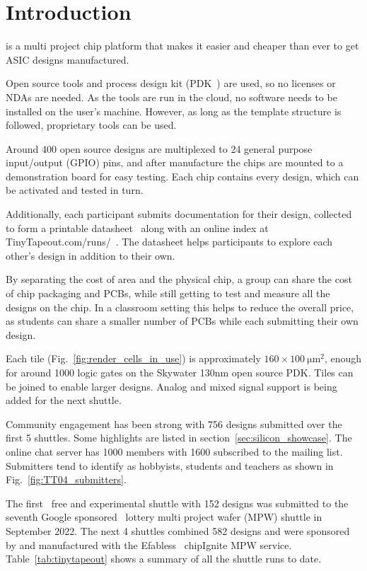 \section{Introduction}
\label{sec:introduction}
 is a multi project chip platform that makes it easier and cheaper than ever to get ASIC designs manufactured.

Open source tools and process design kit (PDK~\cite{pdk}) are used, so no licenses or NDAs are needed. As the tools are run in the cloud, no software needs to be installed on the user's machine. However, as long as the template structure is followed, proprietary tools can be used.

Around 400 open source designs are multiplexed to 24 general purpose input/output (GPIO) pins, and after manufacture the chips are mounted to a demonstration board for easy testing. Each chip contains every design, which can be activated and tested in turn.

Additionally, each participant submits documentation for their design, collected to form a printable datasheet~\cite{datasheet} along with an online index at TinyTapeout.com/runs/~\cite{tinytapeoutruns}. The datasheet helps participants to explore each other's design in addition to their own.

By separating the cost of area and the physical chip, a group can share the cost of chip packaging and PCBs, while still getting to test and measure all the designs on the chip. In a classroom setting this helps to reduce the overall price, as students can share a smaller number of PCBs while each submitting their own design.

Each tile (Fig.~\ref{fig:render_cells_in_use}) is approximately $160 \times \qty{100}{\micro\meter\squared}$, enough for around 1000 logic gates on the Skywater 130nm open source PDK. Tiles can be joined to enable larger designs. Analog and mixed signal support is being added for the next shuttle.

Community engagement has been strong with 756 designs submitted over the first 5 shuttles. Some highlights are listed in section~\ref{sec:silicon_showcase}.
The online chat server has 1000 members with 1600 subscribed to the mailing list. Submitters tend to identify as hobbyists, students and teachers as shown in Fig.~\ref{fig:TT04_submitters}.

The first~\cite{firstshuttle} free and experimental shuttle with 152 designs was submitted to the seventh Google sponsored~\cite{googlesponsored} lottery multi project wafer (MPW) shuttle in September 2022.
The next 4 shuttles combined 582 designs and were sponsored by and manufactured with the Efabless~\cite{efabless} chipIgnite MPW service. Table~\ref{tab:tinytapeout} shows a summary of all the shuttle runs to date.

